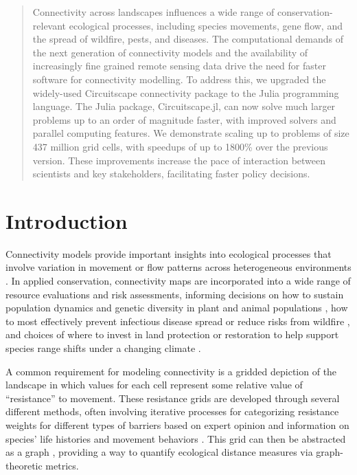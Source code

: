 \documentclass{juliacon}
\begin{document}

\maketitle

\begin{abstract}
Connectivity across landscapes influences a wide range of conservation-relevant ecological processes, including species movements, gene flow, and the spread of wildfire, pests, and diseases. The computational demands of the next generation of connectivity models and the availability of increasingly fine grained remote sensing data drive the need for faster software for connectivity modelling. To address this, we upgraded the widely-used Circuitscape connectivity package to the Julia programming language. The Julia package, Circuitscape.jl, can now solve much larger problems up to an order of magnitude faster, with improved solvers and parallel computing features. We demonstrate scaling up to problems of size 437 million grid cells, with speedups of up to 1800\% over the previous version. These improvements increase the pace of interaction between scientists and key stakeholders, facilitating faster policy decisions. 

\end{abstract}

\section{Introduction}
Connectivity models provide important insights into ecological processes that involve variation in movement or flow patterns across heterogeneous environments \cite{crooks2006}. In applied conservation, connectivity maps are incorporated into a wide range of resource evaluations and risk assessments, informing decisions on how to sustain population dynamics and genetic diversity in plant and animal populations \cite{kareiva1995connecting}, how to most effectively prevent infectious disease spread or reduce risks from wildfire \cite{gray2016applying}, and choices of where to invest in land protection or restoration to help support species range shifts under a changing climate \cite{heller2009biodiversity, littlefield2017connecting, keeley2017habitat}.  

A common requirement for modeling connectivity is a gridded depiction of the landscape in which values for each cell represent some relative value of “resistance” to movement. These resistance grids are developed through several different methods, often involving iterative processes for categorizing resistance weights for different types of barriers based on expert opinion and information on species’ life histories and movement behaviors \cite{spear2010use, zeller2012estimating}. This grid can then be abstracted as a graph \cite{urban2001landscape}, providing a way to quantify ecological distance measures via graph-theoretic metrics. 
\end{document}
